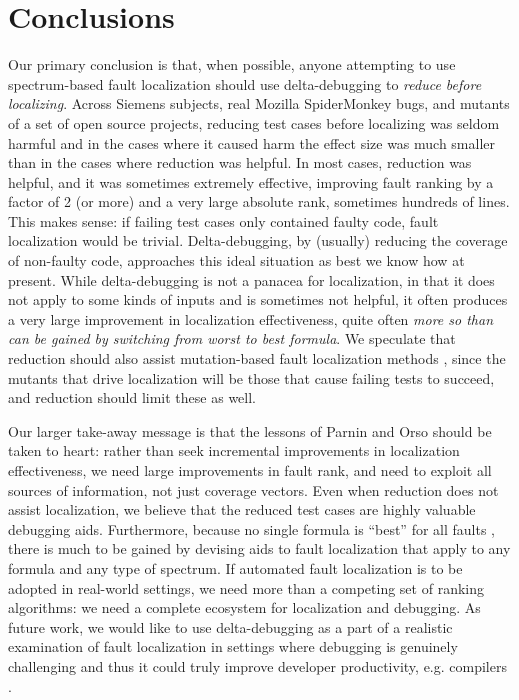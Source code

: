\section{Conclusions}

Our primary conclusion is that, when possible, anyone attempting to
use spectrum-based fault localization should use delta-debugging to
\emph{reduce before localizing}.  Across Siemens subjects, real
Mozilla SpiderMonkey bugs, and mutants of a set of open source
projects, reducing test cases before localizing was seldom harmful and
in the cases where it caused harm the effect size was much smaller
than in the cases where reduction was helpful.  In most cases,
reduction was helpful, and it was sometimes extremely effective,
improving fault ranking by a factor of 2 (or more) and a very large
absolute rank, sometimes hundreds of lines. This makes sense: if
failing test cases only contained faulty code, fault localization
would be trivial.  Delta-debugging, by (usually) reducing the coverage
of non-faulty code, approaches this ideal situation as best we know
how at present.  While delta-debugging is not a panacea for
localization, in that it does not apply to some kinds of inputs and is
sometimes not helpful, it often produces a very large improvement in
localization effectiveness, quite often \emph{more so than can be
gained by switching from worst to best formula}.  We speculate that
reduction should also assist mutation-based fault localization methods
\cite{MUSE,multilingual,compilemutant,ISSRE18}, since the mutants
that drive localization will be those that cause failing tests to
succeed, and reduction should limit these as well.

Our larger take-away message is that the lessons of Parnin and Orso
\cite{AutoHelp} should be taken to heart: rather than seek incremental
improvements in localization effectiveness, we need large improvements
in fault rank, and need to exploit all sources of information, not
just coverage vectors.  Even when reduction does not assist
localization, we believe that the reduced test cases are highly
valuable debugging aids.  Furthermore, because no single formula is
``best'' for all faults \cite{yoo2014no}, there is much to be gained
by devising aids to fault localization that apply to any formula and
any type of spectrum.  If automated fault localization is to be
adopted in real-world settings, we need more than a competing set of
ranking algorithms: we need a complete ecosystem for localization and
debugging.  As future work, we would like to use delta-debugging as a part of a
realistic examination of fault localization in settings where
debugging is genuinely challenging and thus it
could truly improve developer productivity, e.g. compilers \cite{ISSRE18}.
